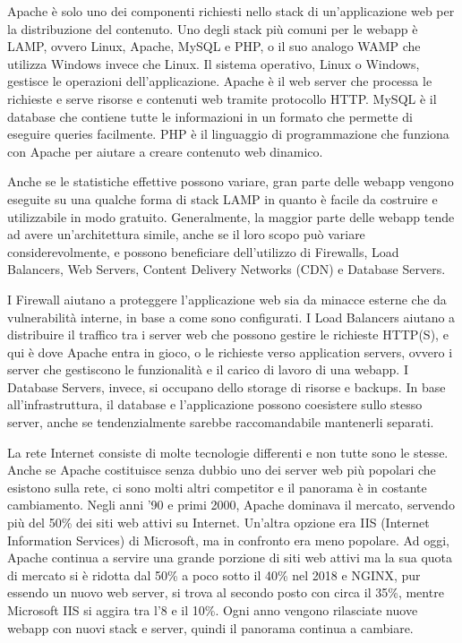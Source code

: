 Apache è solo uno dei componenti richiesti nello stack di un'applicazione web per la distribuzione del contenuto. Uno degli stack più comuni per le webapp è LAMP, ovvero Linux, Apache, MySQL e PHP, o il suo analogo WAMP che utilizza Windows invece che Linux. Il sistema operativo, Linux o Windows, gestisce le operazioni dell'applicazione. Apache è il web server che processa le richieste e serve risorse e contenuti web tramite protocollo HTTP. MySQL è il database che contiene tutte le informazioni in un formato che permette di eseguire queries facilmente. PHP è il linguaggio di programmazione che funziona con Apache per aiutare a creare contenuto web dinamico.

Anche se le statistiche effettive possono variare, gran parte delle webapp vengono eseguite su una qualche forma di stack LAMP in quanto è facile da costruire e utilizzabile in modo gratuito. Generalmente, la maggior parte delle webapp tende ad avere un'architettura simile, anche se il loro scopo può variare considerevolmente, e possono beneficiare dell'utilizzo di Firewalls, Load Balancers, Web Servers, Content Delivery Networks (CDN) e Database Servers.

I Firewall aiutano a proteggere l'applicazione web sia da minacce esterne che da vulnerabilità interne, in base a come sono configurati. I Load Balancers aiutano a distribuire il traffico tra i server web che possono gestire le richieste HTTP(S), e qui è dove Apache entra in gioco, o le richieste verso application servers, ovvero i server che gestiscono le funzionalità e il carico di lavoro di una webapp. I Database Servers, invece, si occupano dello storage di risorse e backups. In base all'infrastruttura, il database e l'applicazione possono coesistere sullo stesso server, anche se tendenzialmente sarebbe raccomandabile mantenerli separati.

La rete Internet consiste di molte tecnologie differenti e non tutte sono le stesse. Anche se Apache costituisce senza dubbio uno dei server web più popolari che esistono sulla rete, ci sono molti altri competitor e il panorama è in costante cambiamento. Negli anni '90 e primi 2000, Apache dominava il mercato, servendo più del 50\% dei siti web attivi su Internet. Un'altra opzione era IIS (Internet Information Services) di Microsoft, ma in confronto era meno popolare. Ad oggi, Apache continua a servire una grande porzione di siti web attivi ma la sua quota di mercato si è ridotta dal 50\% a poco sotto il 40\% nel 2018 e NGINX, pur essendo un nuovo web server, si trova al secondo posto con circa il 35\%, mentre Microsoft IIS si aggira tra l'8 e il 10\%. Ogni anno vengono rilasciate nuove webapp con nuovi stack e server, quindi il panorama continua a cambiare.

